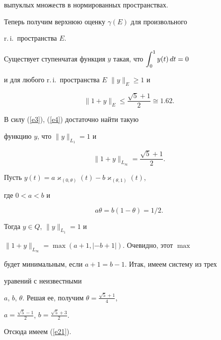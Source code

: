 выпуклых множеств в нормированных пространствах.





Теперь получим верхнюю оценку $\gamma(E)$ для произвольного


r.\,i.\ пространства $E$.





\begin{lem}\label{l4}


Существует ступенчатая функция $y$ такая, что $\displaystyle\int_{0}^{1} y(t)\, dt=0$ 


и для любого r.\,i.\ пространства $E$ $\|y\|_E\ge 1 $ и


\begin{equation}\label{e20}


\|1 + y \|_E \le \frac {\sqrt 5 +1} 2 \cong 1.62.


\end{equation}


\end{lem}





\begin{pf}


В силу (\ref{e3}), (\ref{e4}) достаточно найти такую 


функцию $y$, что $\|y\|_{L_1} =1$ и


\begin{equation}\label{e21}


\|1 + y \|_{L_\infty} = \frac {\sqrt 5 +1} 2.


\end{equation}


Пусть $y (t)=a \varkappa_{(0, \theta)}(t) - b \varkappa_{(\theta ,1 )}(t)$, 


где $0 < a< b$ и


$$


a\theta = b (1- \theta ) = 1/2.


$$


Тогда $y\in Q$, $\|y\|_{L_1} =1$ и 


$\|1 + y\|_{L_\infty} = \max(a+1, |-b +1|)$. Очевидно, этот $\max$ 


будет минимальным, если $a+1 = b-1$. Итак, имеем систему из трех


уравений с неизвестными


$a$, $b$, $\theta$. Решая ее, получим $\theta = \frac {\sqrt 5 + 1} 4$, 


$a = \frac{\sqrt 5 - 1} 2$, $b = \frac {\sqrt 5+3} 2$. 


Отсюда имеем (\ref{e21}).


\end{pf}





